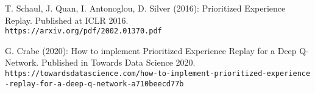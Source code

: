 \documentclass[11pt]{article} %
\begin{document}
\begin{thebibliography}{2}

T. Schaul, J. Quan, I. Antonoglou, D. Silver (2016): Prioritized Experience Replay. Published at ICLR 2016.\\
\texttt{https://arxiv.org/pdf/2002.01370.pdf}

G. Crabe (2020): 
How to implement Prioritized Experience Replay for a Deep Q-Network. Published in Towards Data Science 2020.\\
\texttt{https://towardsdatascience.com/how-to-implement-prioritized-experience\\-replay-for-a-deep-q-network-a710beecd77b}


\end{thebibliography}
\end{document}
